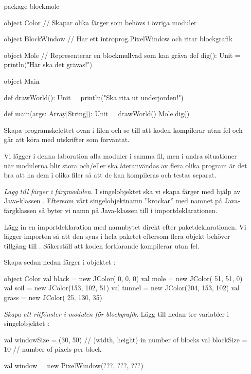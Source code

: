 \begin{Code}
package blockmole

object Color {
  // Skapar olika färger som behövs i övriga moduler
}

object BlockWindow {
  // Har ett introprog.PixelWindow och ritar blockgrafik
}

object Mole { // Representerar en blockmullvad som kan gräva
  def dig(): Unit = println("Här ska det grävas!")
}

object Main {
  def drawWorld(): Unit = println("Ska rita ut underjorden!")

  def main(args: Array[String]): Unit = {
    drawWorld()
    Mole.dig()
  }
}
\end{Code}

\noindent Skapa programskelettet ovan i filen  och se till att koden kompilerar utan fel och går att köra med utskrifter som förväntat.

Vi lägger i denna laboration alla moduler i samma fil, men i andra situationer när  modulerna blir stora och/eller ska återanvändas av flera olika program är det bra att ha dem i olika filer så att de kan kompileras och testas separat.


\Task \emph{Lägg till färger i färgmodulen.} I singelobjektet  ska vi skapa färger med hjälp av Java-klassen . Eftersom vårt singelobjektnamn ''krockar'' med namnet på Java-färgklassen så byter vi namn på Java-klassen till  i importdeklarationen.

\Subtask
Lägg in en importdeklaration med namnbytet direkt efter paketdeklarationen. Vi lägger importen så att den syns i hela paketet eftersom flera objekt behöver tillgång till . Säkerställ att koden fortfarande kompilerar utan fel.

\Subtask
Skapa sedan nedan färger i objektet :
\begin{Code}
object Color {
  val black  = new JColor(  0,   0,   0)
  val mole   = new JColor( 51,  51,   0)
  val soil   = new JColor(153, 102,  51)
  val tunnel = new JColor(204, 153, 102)
  val grass  = new JColor( 25, 130,  35)
}
\end{Code}


\Task \emph{Skapa ett ritfönster i modulen för blockgrafik.} Lägg till nedan tre variabler i singelobjektet :

\begin{Code}
  val windowSize = (30, 50)  // (width, height) in number of blocks
  val blockSize  = 10        // number of pixels per block

  val window = new PixelWindow(???, ???, ???)
\end{Code}

